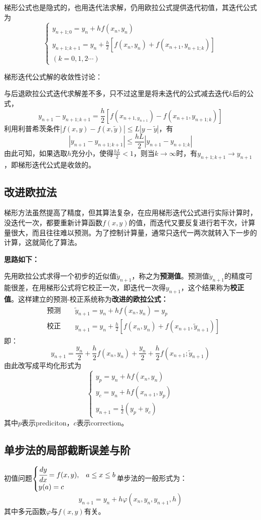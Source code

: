 梯形公式也是隐式的，也用迭代法求解，仍用欧拉公式提供迭代初值，其迭代公式为
$$\begin{cases}y_{n+1;0}=y_n+hf(x_n,y_n)\\
y_{n+1;k+1}=y_n+\frac{h}{2}[f(x_n,y_n)+f(x_{n+1},y_{n+1;k})]\\
(k=0,1,2\cdots)\end{cases}$$

梯形迭代公式解的收敛性讨论：

与后退欧拉公式迭代求解差不多，只不过这里是将未迭代的公式减去迭代$k$后的公式，
$$y_{n+1}-y_{n+1;k+1}=\frac{h}{2}[f(x_{n+1,y_{n+1}})-f(x_{n+1},y_{n+1;k})]$$
利用利普希茨条件$|f(x,y)-f(x,\tilde{y})|\le L|y-\tilde{y}|$，有
$$|y_{n+1}-y_{n+1;k+1}|\le \frac{hL}{2}|y_{n+1}-y_{n+1;k}|$$
由此可知，如果选取$h$充分小，使得$\frac{hL}{2}<1$，则当$k\rightarrow \infty$时，有$y_{n+1;k+1}\rightarrow y_{n+1}$，即梯形迭代公式是收敛的。



\subsection{改进欧拉法}
梯形方法虽然提高了精度，但其算法复杂，在应用梯形迭代公式进行实际计算时，没迭代一次，都要重新计算函数$f(x,y)$的值，而迭代又要反复进行若干次，计算量很大，而且往往难以预测。为了控制计算量，通常只迭代一两次就转入下一步的计算，这就简化了算法。

\textbf{思路如下：}

先用欧拉公式求得一个初步的近似值$\tilde{y}_{n+1}$，称之为\textbf{预测值}。预测值$\tilde{y}_{n+1}$的精度可能很差，在用梯形公式将它校正一次，即迭代一次得$y_{n+1}$，这个结果称为\textbf{校正值}。这样建立的预测-校正系统称为\textbf{改进的欧拉公式：}
\begin{align*}
&\text{预测}\qquad \tilde{y}_{n+1}=y_n+hf(x_n,y_n)=y_p\\
&\text{校正}\qquad y_{n+1}=y_n+\frac{h}{2}[f(x_n,y_n)+f(x_{n+1},\tilde{y}_{n+1})]
\end{align*}
即：
$$y_{n+1}=\frac{y_n}{2}+\frac{h}{2}f(x_n,y_n)+\frac{y_n}{2}+\frac{h}{2}f(x_{n+1};\tilde{y}_{n+1})$$
由此改写成平均化形式为
$$\begin{cases}
y_p = y_n+hf(x_n,y_n)\\
y_c = y_n+hf(x_{n+1},y_p)\\
y_{n+1}=\frac{1}{2}(y_p+y_c)
\end{cases}$$
其中$p$表示prediciton，$c$表示correction。




\subsection{单步法的局部截断误差与阶}
初值问题$\begin{cases}\cfrac{dy}{dx}=f(x,y),&a\le x\le b\\ y(a)=c &\end{cases}$单步法的一般形式为：
$$y_{n+1}=y_n+h\varphi(x_n,y_n,y_{n+1},h)$$
其中多元函数$\varphi$与$f(x,y)$有关。

